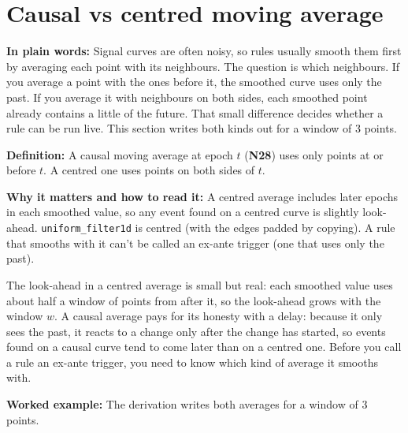 \documentclass[11pt,a4paper,oneside,openany]{report}
\newcommand{\code}[1]{\texttt{#1}}
\newcommand{\gl}[1]{\textbf{#1}}   %
\newcommand{\fplain}{\textbf{In plain words:} }
\newcommand{\fdef}{\textbf{Definition:} }
\newcommand{\fread}{\par\textbf{Why it matters and how to read it:} }
\newcommand{\fex}{\par\textbf{Worked example:} }
\begin{document}
\section{Causal vs centred moving average}
\fplain Signal curves are often noisy, so rules usually smooth them first by averaging each point with its neighbours. The question is which neighbours. If you average a point with the ones before it, the smoothed curve uses only the past. If you average it with neighbours on both sides, each smoothed point already contains a little of the future. That small difference decides whether a rule can be run live. This section writes both kinds out for a window of 3 points.

\fdef A causal moving average at epoch $t$ (\gl{N28}) uses only points at or before $t$. A centred one uses points on both sides of $t$.
\fread A centred average includes later epochs in each smoothed value, so any event found on a centred curve is slightly look-ahead. \code{uniform\_\allowbreak{}filter1d} is centred (with the edges padded by copying). A rule that smooths with it can't be called an ex-ante trigger (one that uses only the past).

The look-ahead in a centred average is small but real: each smoothed value uses about half a window of points from after it, so the look-ahead grows with the window $w$. A causal average pays for its honesty with a delay: because it only sees the past, it reacts to a change only after the change has started, so events found on a causal curve tend to come later than on a centred one. Before you call a rule an ex-ante trigger, you need to know which kind of average it smooths with.

\fex The derivation writes both averages for a window of 3 points.
\end{document}
